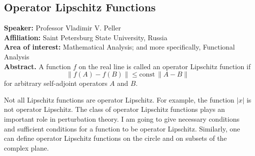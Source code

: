 %
%
\subsection*{Operator Lipschitz Functions} %
\noindent
\textbf{Speaker:} Professor Vladimir V. Peller \\ %
\textbf{Affiliation:} Saint Petersburg State University, Russia \\ %
\textbf{Area of interest:} Mathematical Analysis; and more specifically, Functional Analysis \\

\noindent\textbf{Abstract.} A function \(f\) on the real line is called an operator Lipschitz function if
\[
    \|f(A)-f(B)\|\le \text{const} \, \|A-B\|
\]
for arbitrary self-adjoint operators \(A\) and \(B\).

Not all Lipschitz functions are operator Lipschitz. For example, the function \(|x|\) is not operator Lipschitz.
The class of operator Lipschitz functions plays an important role in perturbation theory.
I am going to give necessary conditions and sufficient conditions for a function to be operator Lipschitz. 
Similarly, one can define operator Lipschitz functions on the circle and on subsets of the complex plane.


